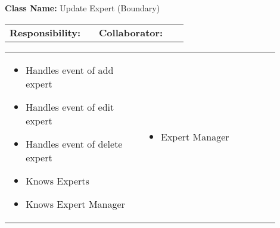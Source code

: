 \begin{cards}[]
    \textbf{Class Name:} Update Expert (Boundary)
    \tcbline
    \begin{tabular}{p{0.45\linewidth} | p{0.45\linewidth}}
        \textbf{Responsibility:}& 
        \textbf{Collaborator:}\\
    \end{tabular}
    \tcbline
    \begin{tabular}{p{0.45\linewidth} | p{0.45\linewidth}}
        \begin{itemize}
            \item Handles event of add expert
            \item Handles event of edit expert
            \item Handles event of delete expert
            \item Knows Experts
            \item Knows Expert Manager
        \end{itemize}
        &
        \begin{itemize}
            \item Expert Manager
        \end{itemize}
    \end{tabular}
\end{cards}